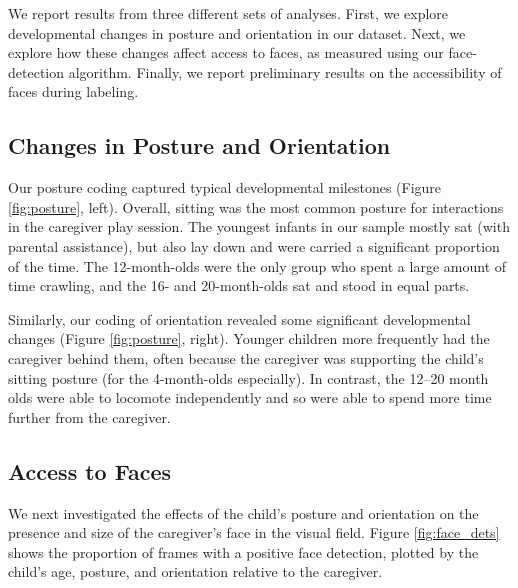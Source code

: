 \documentclass[man,noapacite]{apa2}
\begin{document}
We report results from three different sets of analyses. First, we explore developmental changes in posture and orientation in our dataset. Next, we explore how these changes affect access to faces, as measured using our face-detection algorithm. Finally, we report preliminary results on the accessibility of faces during labeling.

\subsection{Changes in Posture and Orientation}
 
Our posture coding captured typical developmental milestones (Figure \ref{fig:posture}, left). Overall, sitting was the most common posture for interactions in the caregiver play session. The youngest infants in our sample mostly sat (with parental assistance), but also lay down and were carried a significant proportion of the time. The 12-month-olds were the only group who spent a large amount of time crawling, and the 16- and 20-month-olds sat and stood in equal parts. 

Similarly, our coding of orientation revealed some significant developmental changes (Figure \ref{fig:posture}, right). Younger children more frequently had the caregiver behind them, often because the caregiver was supporting the child's sitting posture (for the 4-month-olds especially). In contrast, the 12--20 month olds were able to locomote independently and so were able to spend more time further from the caregiver. 




\subsection{Access to Faces }

We next investigated the effects of the child's posture and orientation on the presence and size of the caregiver's face in the visual field. Figure \ref{fig:face_dets} shows the proportion of frames with a positive face detection, plotted by the child's age, posture, and orientation relative to the caregiver. 
\end{document}
